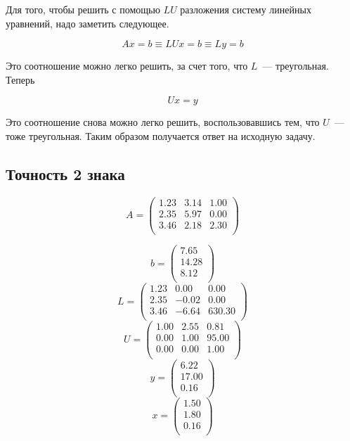 \documentclass[11pt,a4paper,oneside]{article}
\begin{document}
Для того, чтобы решить с помощью $LU$ разложения систему линейных уравнений, надо заметить следующее.

$$ Ax = b \equiv LUx = b \equiv Ly = b $$

Это соотношение можно легко решить, за счет того, что $L$~--- треугольная. Теперь

$$ Ux = y $$

Это соотношение снова можно легко решить, воспользовавшись тем, что $U$~--- тоже треугольная. Таким образом получается ответ на исходную задачу.
	
\subsection{Точность 2 знака}

$$ A = \left(\begin{matrix}
	1.23 & 3.14 & 1.00 \\
	2.35 & 5.97 & 0.00 \\
	3.46 & 2.18 & 2.30 \\
\end{matrix}\right) $$

$$ b = \left(\begin{matrix}
	7.65 \\
	14.28 \\
	8.12 \\
\end{matrix}\right) $$
$$L=\left(\begin{matrix} 1.23 & 0.00 & 0.00\\ 2.35 & -0.02 & 0.00\\ 3.46 & -6.64 & 630.30\\ \end{matrix}\right)$$
$$U=\left(\begin{matrix} 1.00 & 2.55 & 0.81\\ 0.00 & 1.00 & 95.00\\ 0.00 & 0.00 & 1.00\\ \end{matrix}\right)$$
$$y=\left(\begin{matrix} 6.22\\ 17.00\\ 0.16\\ \end{matrix}\right)$$
$$x=\left(\begin{matrix} 1.50\\ 1.80\\ 0.16\\ \end{matrix}\right)$$
\end{document}
